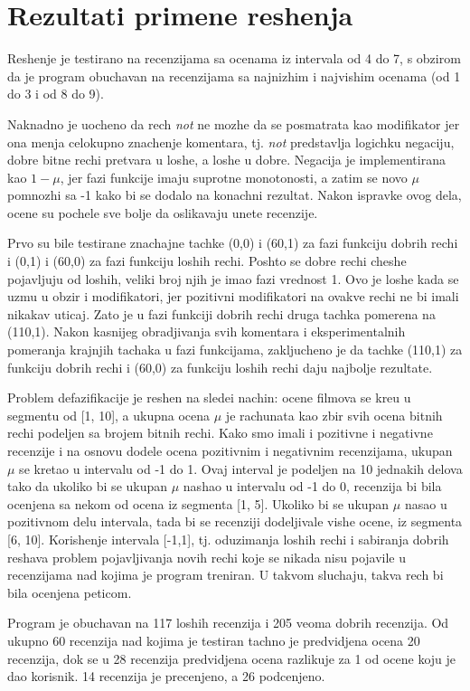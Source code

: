 \documentclass[cyr]{bibl}
\begin{document}
\newpage
\section{Rezultati primene reshenja}
\begin{justify}
Reshenje je testirano na recenzijama sa ocenama iz intervala od 4 do 7, s obzirom da je program obuchavan na recenzijama sa najnizhim i najvishim ocenama (od 1 do 3 i od 8 do 9).

Naknadno je uocheno da rech \textit{\Lat not} ne mozhe da se posmatrata kao modifikator jer ona menja celokupno znachenje komentara, tj. \textit{\Lat not} predstavlja logichku negaciju, dobre bitne rechi pretvara u loshe, a loshe u dobre. Negacija je implementirana kao \(1 - \mu\), jer fazi funkcije imaju suprotne monotonosti, a zatim se novo \(\mu\) pomnozhi sa -1 kako bi se dodalo na konachni rezultat. Nakon ispravke ovog dela, ocene su pochele sve bolje da oslikavaju unete recenzije.

Prvo su bile testirane znachajne tachke (0,0) i (60,1) za fazi funkciju dobrih rechi i (0,1) i (60,0) za fazi funkciju loshih rechi. Poshto se dobre rechi chesh\cc e pojavljuju od loshih, veliki broj njih je imao fazi vrednost 1. Ovo je loshe kada se uzmu u obzir i modifikatori, jer pozitivni modifikatori na ovakve rechi ne bi imali nikakav uticaj. Zato je u fazi funkciji dobrih rechi druga tachka pomerena na (110,1). Nakon kasnijeg obradjivanja svih komentara i eksperimentalnih pomeranja krajnjih tachaka u fazi funkcijama, zakljucheno je da tachke (110,1) za funkciju dobrih rechi i (60,0) za funkciju loshih rechi daju najbolje rezultate.  

Problem defazifikacije je reshen na slede\cc i nachin: ocene filmova se kre\cc u u segmentu od [1, 10], a ukupna ocena \(\mu\) je rachunata kao zbir svih ocena bitnih rechi podeljen sa brojem bitnih rechi. Kako smo imali i pozitivne i negativne recenzije i na osnovu dodele ocena pozitivnim i negativnim recenzijama, ukupan \(\mu\) se kretao u intervalu od -1 do 1.
Ovaj interval je podeljen na 10 jednakih delova tako da ukoliko bi se ukupan \(\mu\) nashao u intervalu od -1 do 0, recenzija bi bila ocenjena sa nekom od ocena iz segmenta [1, 5]. Ukoliko bi se ukupan \(\mu\) nasao u pozitivnom delu intervala, tada bi se recenziji dodeljivale vishe ocene, iz segmenta [6, 10]. Korish\cc enje intervala [-1,1], tj. oduzimanja loshih rechi i sabiranja dobrih reshava problem pojavljivanja novih rechi koje se nikada nisu pojavile u recenzijama nad kojima je program treniran. U takvom sluchaju, takva rech bi bila ocenjena peticom.

Program je obuchavan na 117 loshih recenzija i 205 veoma dobrih recenzija. Od ukupno 60 recenzija nad kojima je testiran tachno je predvidjena ocena 20 recenzija, dok se u 28 recenzija predvidjena ocena razlikuje za 1 od ocene koju je dao korisnik. 14 recenzija je precenjeno, a 26 podcenjeno.
\end{justify}
\end{document}
